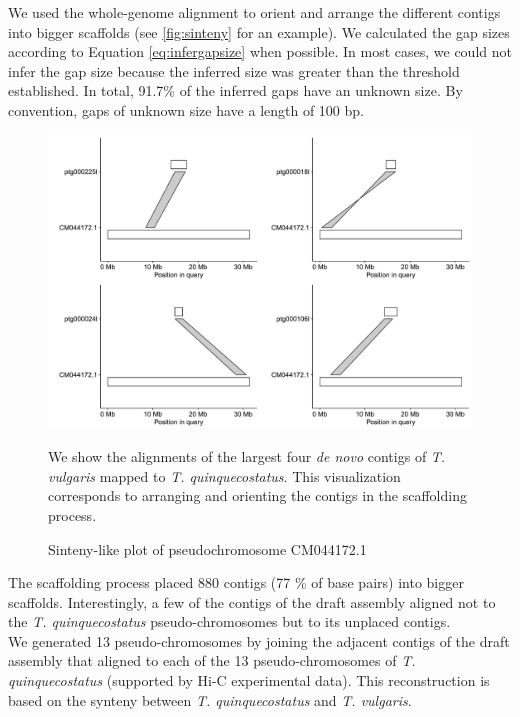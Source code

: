 We used the whole-genome alignment to orient and arrange the different contigs into bigger scaffolds (see \autoref{fig:sinteny} for an example). We calculated the gap sizes according to Equation \eqref{eq:infergapsize} when possible. In most cases, we could not infer the gap size because the inferred size was greater than the threshold established. In total, 91.7\% of the inferred gaps have an unknown size. By convention, gaps of unknown size have a  length of 100 bp.\cite{AGPSpecificationV2}\\

\begin{figure}
\begin{center}
    \includegraphics[width=\textwidth]{gfx/CM044172.1_sinteny.pdf}
    \caption{Sinteny-like plot of pseudochromosome CM044172.1}  
    \label{fig:sinteny}    
\end{center}
\footnotesize
We show the alignments of the largest four \textit{de novo} contigs of \textit{T. vulgaris} mapped to \textit{T. quinquecostatus}. This visualization corresponds to arranging and orienting the contigs in the scaffolding process. 
\end{figure} 


The scaffolding process placed 880 contigs (77 \% of base pairs) into bigger scaffolds. Interestingly, a few of the contigs of the draft assembly aligned not to the \textit{T. quinquecostatus} pseudo-chromosomes but to its unplaced contigs.\\

We generated 13 pseudo-chromosomes by joining the adjacent contigs of the draft assembly that aligned to each of the 13 pseudo-chromosomes of \textit{T. quinquecostatus} (supported by \ac{Hi-C} experimental data). This reconstruction is based on the synteny between 
\textit{T. quinquecostatus} and \textit{T. vulgaris}.\\

